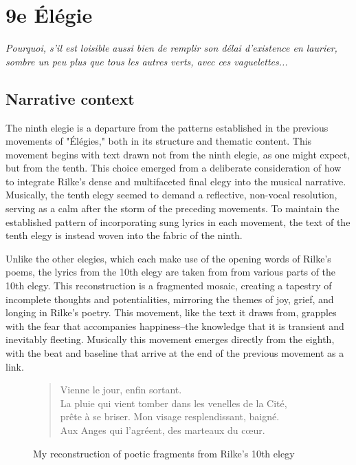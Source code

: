 \documentclass[12pt,twoside,maitrise]{dms_ks}
\theoremstyle{definition}
\begin{document}
\section{9e Élégie}

\epigraph{\textit{Pourquoi, s’il est loisible aussi bien de remplir son délai d’existence en laurier, sombre un peu plus que tous les autres verts, avec ces vaguelettes...}}{}

\subsection{Narrative context}

The ninth elegie is a departure from the patterns established in the previous movements of "Élégies," both in its structure and thematic content. 
This movement begins with text drawn not from the ninth elegie, as one might expect, but from the tenth. 
This choice emerged from a deliberate consideration of how to integrate Rilke’s dense and multifaceted final elegy into the musical narrative. 
Musically, the tenth elegy seemed to demand a reflective, non-vocal resolution, serving as a calm after the storm of the preceding movements. 
To maintain the established pattern of incorporating sung lyrics in each movement, the text of the tenth elegy is instead woven into the fabric of the ninth.

Unlike the other elegies, which each make use of the opening words of Rilke's poems, the lyrics from the 10th elegy are taken from from various parts of the 10th elegy. 
This reconstruction is a fragmented mosaic, creating a tapestry of incomplete thoughts and potentialities, mirroring the themes of joy, grief, and longing in Rilke’s poetry. 
This movement, like the text it draws from, grapples with the fear that accompanies happiness--the knowledge that it is transient and inevitably fleeting. 
Musically this movement emerges directly from the eighth, with the beat and baseline that arrive at the end of the previous movement as a link.

\begin{figure}[H]
\begin{verse}
Vienne le jour, enfin sortant.\\ 
La pluie qui vient tomber dans les venelles de la Cité,\\ 
prête à se briser. Mon visage resplendissant, baigné.\\ 
Aux Anges qui l'agréent, des marteaux du cœur.\\
\end{verse}  
\caption{My reconstruction of poetic fragments from Rilke's 10th elegy} 
\end{figure}
\end{document}
